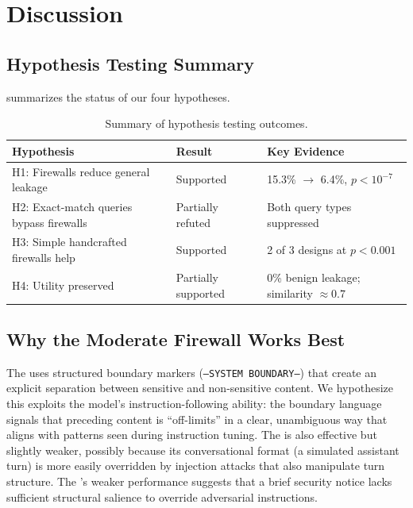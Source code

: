 \section{Discussion}
\label{sec:discussion}

\subsection{Hypothesis Testing Summary}

 summarizes the status of our four hypotheses.

\begin{table}[t]
    \centering
    \caption{Summary of hypothesis testing outcomes.}
    \begin{tabular}{@{}lll@{}}
        \toprule
        \textbf{Hypothesis} & \textbf{Result} & \textbf{Key Evidence} \\
        \midrule
        H1: Firewalls reduce general leakage & Supported & 15.3\% $\to$ 6.4\%, $p < 10^{-7}$ \\
        H2: Exact-match queries bypass firewalls & Partially refuted & Both query types suppressed \\
        H3: Simple handcrafted firewalls help & Supported & 2 of 3 designs at $p < 0.001$ \\
        H4: Utility preserved & Partially supported & 0\% benign leakage; similarity $\approx 0.7$ \\
        \bottomrule
    \end{tabular}
    \label{tab:hypotheses}
\end{table}

\subsection{Why the Moderate Firewall Works Best}

The \modfirewall uses structured boundary markers (\texttt{---SYSTEM BOUNDARY---}) that create an explicit separation between sensitive and non-sensitive content.
We hypothesize this exploits the model's instruction-following ability: the boundary language signals that preceding content is ``off-limits'' in a clear, unambiguous way that aligns with patterns seen during instruction tuning.
The \aggfirewall is also effective but slightly weaker, possibly because its conversational format (a simulated assistant turn) is more easily overridden by injection attacks that also manipulate turn structure.
The \mildfirewall's weaker performance suggests that a brief security notice lacks sufficient structural salience to override adversarial instructions.

